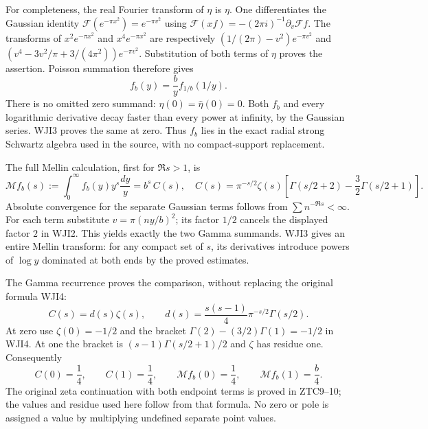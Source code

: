 For completeness, the real Fourier transform of $\eta$ is $\eta$.
One differentiates the Gaussian identity
$\mathcal F(e^{-\pi x^2})=e^{-\pi v^2}$ using
$\mathcal F(xf)=-(2\pi i)^{-1}\partial_v\mathcal Ff$.
The transforms of $x^2e^{-\pi x^2}$ and $x^4e^{-\pi x^2}$
are respectively
$(1/(2\pi)-v^2)e^{-\pi v^2}$ and
$(v^4-3v^2/\pi+3/(4\pi^2))e^{-\pi v^2}$.
Substitution of both terms of $\eta$ proves the assertion.
Poisson summation therefore gives
\begin{equation}\tag{WJI3}
 f_b(y)=\frac b y f_{1/b}(1/y).
\end{equation}
There is no omitted zero summand: $\eta(0)=\widehat\eta(0)=0$.
Both $f_b$ and every logarithmic derivative decay faster than
every power at infinity, by the Gaussian series. WJI3 proves
the same at zero. Thus $f_b$ lies in the exact radial strong
Schwartz algebra used in the source, with no compact-support
replacement.

The full Mellin calculation, first for $\Re s>1$, is
\begin{equation}\tag{WJI4}
 \mathcal Mf_b(s):=\int_0^\infty f_b(y)y^s\frac{dy}{y}
 =b^s\,C(s),\quad
 C(s)=\pi^{-s/2}\zeta(s)
       \left[\Gamma(s/2+2)-\frac32\Gamma(s/2+1)\right].
\end{equation}
Absolute convergence for the separate Gaussian terms follows
from $\sum n^{-\Re s}<\infty$. For each term substitute
$v=\pi(ny/b)^2$; its factor $1/2$ cancels the displayed
factor $2$ in WJI2. This yields exactly the two Gamma summands.
WJI3 gives an entire Mellin transform: for any compact set of
$s$, its derivatives introduce powers of $\log y$ dominated
at both ends by the proved estimates.

The Gamma recurrence proves the comparison, without replacing
the original formula WJI4:
\begin{equation}\tag{WJI5}
 C(s)=d(s)\zeta(s),\qquad
 d(s)=\frac{s(s-1)}4\pi^{-s/2}\Gamma(s/2).
\end{equation}
At zero use $\zeta(0)=-1/2$ and the bracket
$\Gamma(2)-(3/2)\Gamma(1)=-1/2$ in WJI4.
At one the bracket is
$(s-1)\Gamma(s/2+1)/2$ and $\zeta$ has residue one.
Consequently
\begin{equation}\tag{WJI6}
 C(0)=\frac14,\qquad C(1)=\frac14,\qquad
 \mathcal Mf_b(0)=\frac14,\qquad
 \mathcal Mf_b(1)=\frac b4.
\end{equation}
The original zeta continuation with both endpoint terms is proved
in ZTC9--10; the values and residue used here follow from that
formula. No zero or pole is assigned a value by multiplying
undefined separate point values.

